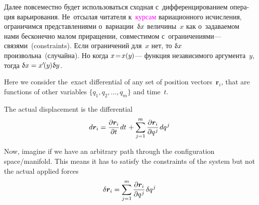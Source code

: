 

\begin{otherlanguage}{russian}

Далее повсеместно будет использоваться сходная с~дифференцированием операция варьирования. Не~отсылая читателя к~\textcolor{magenta}{курсам} вариационного исчисления, ограничимся представлениями о~вариации~${\updelta\hspace{-0.1ex}x}$ величины~$x$ как о~задаваемом нами бесконечно малом приращении, совместимом с~ограничениями\:--- связями~(constraints). Если ограничений для~$x$ нет, то ${\updelta\hspace{-0.1ex}x}$ произвольна~(случайна). Но когда ${x \!=\! x(y\hspace{-0.1ex})}$\:--- функция независимого аргумента~$y$, тогда ${\updelta\hspace{-0.1ex}x = x'\hspace{-0.25ex}(y\hspace{-0.1ex}) \hspace{.1ex} \updelta\hspace{-0.1ex}y}$.



{\small
\setlength{\abovedisplayskip}{2pt}\setlength{\belowdisplayskip}{2pt}

Here we consider the~exact differential of any set of position vectors~$\bm{r}_i$, that are functions of other variables ${\displaystyle \lbrace q_{1}, q_{2}, ..., q_{m}\rbrace }$ and time~$t$.

The actual displacement is the differential
\[\displaystyle d\bm{r}_{i} = \frac{\partial \bm{r}_{i}}{\partial t} \hspace{.16ex} dt \hspace{.2ex} + \sum_{j=1}^{m} {\frac{\partial \bm{r}_{i}}{\partial q^{\hspace{.1ex}j}}} \hspace{.2ex} dq^{\hspace{.1ex}j}\]

Now, imagine if we have an arbitrary path through the configuration space/manifold. This means it has to satisfy the constraints of the system but not the actual applied forces
\[\displaystyle \delta \bm{r}_{i}=\sum _{j=1}^{m} {\frac {\partial \bm{r}_{i}}{\partial q^{\hspace{.1ex}j}}} \hspace{.2ex} \delta q^{\hspace{.1ex}j}\]

}
\end{otherlanguage}
